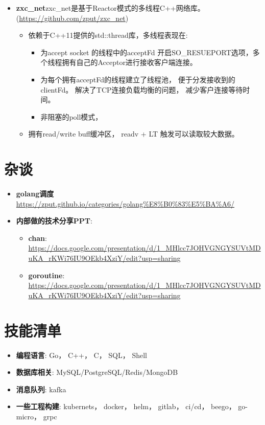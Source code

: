 \documentclass{resume}
\begin{document}
\begin{itemize}[parsep=0.2ex]
  \item \textbf{zxc\_net}zxc\_net是基于Reactor模式的多线程C++网络库。(\url{https://github.com/zput/zxc\_net})
    \begin{itemize}[parsep=0.2ex]
          \item 依赖于C++11提供的std::thread库，多线程表现在:
            \begin{itemize}[parsep=0.2ex]
              \item 为accept socket 的线程中的acceptFd 开启SO\_RESUEPORT选项，多个线程拥有自己的Acceptor进行接收客户端连接。
              \item 为每个拥有acceptFd的线程建立了线程池， 便于分发接收到的clientFd。 解决了TCP连接负载均衡的问题， 减少客户连接等待时间。
              \item 非阻塞的poll模式，
            \end{itemize}
          \item 拥有read/write buff缓冲区， readv + LT 触发可以读取较大数据。
    \end{itemize}
\end{itemize}


\section{杂谈}
\begin{itemize}[parsep=0.2ex]
  \item \textbf{golang调度} \url{https://zput.github.io/categories/golang%E8%B0%83%E5%BA%A6/}
  \item \textbf{内部做的技术分享PPT}:
  \begin{itemize}[parsep=0.2ex]
    \item \textbf{chan}: \url{https://docs.google.com/presentation/d/1_MHlcc7JOHVGNGYSUVtMDuKA_rKWi76IU9OEkb4XziY/edit?usp=sharing}
    \item \textbf{goroutine}: \url{https://docs.google.com/presentation/d/1_MHlcc7JOHVGNGYSUVtMDuKA_rKWi76IU9OEkb4XziY/edit?usp=sharing}
  \end{itemize}
\end{itemize}

\section{技能清单}
\begin{itemize}[parsep=0.2ex]
  \item \textbf{编程语言}: Go， C++， C， SQL， Shell
  \item \textbf{数据库相关}: MySQL/PostgreSQL/Redis/MongoDB
  \item \textbf{消息队列}: kafka
  \item \textbf{一些工程构建}: kubernets， docker， helm， gitlab， ci/cd， beego， go-micro， grpc
\end{itemize}


%
%
\end{document}
